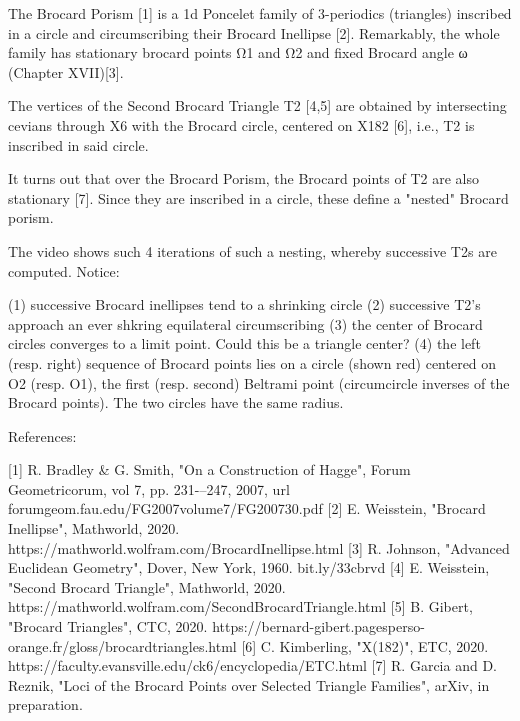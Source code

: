 The Brocard Porism [1] is a 1d Poncelet family of 3-periodics (triangles) inscribed in a circle and circumscribing their Brocard Inellipse [2]. Remarkably, the whole family has stationary brocard points Ω1 and Ω2 and fixed Brocard angle ω (Chapter XVII)[3].

The vertices of the Second Brocard Triangle T2 [4,5] are obtained by intersecting cevians through X6 with the Brocard circle, centered on X182 [6], i.e., T2 is inscribed in said circle.

It turns out that over the Brocard Porism, the Brocard points of T2 are also stationary [7]. Since they are inscribed in a circle, these define a "nested" Brocard porism.

The video shows such 4 iterations of such a nesting, whereby successive T2s are computed. Notice:

(1) successive Brocard inellipses tend to a shrinking circle
(2) successive T2's approach an ever shkring equilateral circumscribing
(3) the center of Brocard circles converges to a limit point. Could this be a triangle center?  
(4) the left (resp. right) sequence of Brocard points lies on a circle (shown red) centered on O2 (resp. O1), the first (resp. second) Beltrami point (circumcircle inverses of the Brocard points). The two circles have the same radius.

References:
 
[1] R. Bradley & G. Smith, "On a Construction of Hagge", Forum Geometricorum, vol 7, pp. 231-–247, 2007, url forumgeom.fau.edu/FG2007volume7/FG200730.pdf
[2] E. Weisstein, "Brocard Inellipse", Mathworld, 2020. https://mathworld.wolfram.com/BrocardInellipse.html
[3] R. Johnson, "Advanced Euclidean Geometry", Dover, New York, 1960. bit.ly/33cbrvd
[4] E. Weisstein, "Second Brocard Triangle", Mathworld, 2020. https://mathworld.wolfram.com/SecondBrocardTriangle.html
[5] B. Gibert, "Brocard Triangles", CTC, 2020. https://bernard-gibert.pagesperso-orange.fr/gloss/brocardtriangles.html
[6] C. Kimberling, "X(182)", ETC, 2020. https://faculty.evansville.edu/ck6/encyclopedia/ETC.html
[7] R. Garcia and D. Reznik, "Loci of the Brocard Points over Selected Triangle Families", arXiv, in preparation.